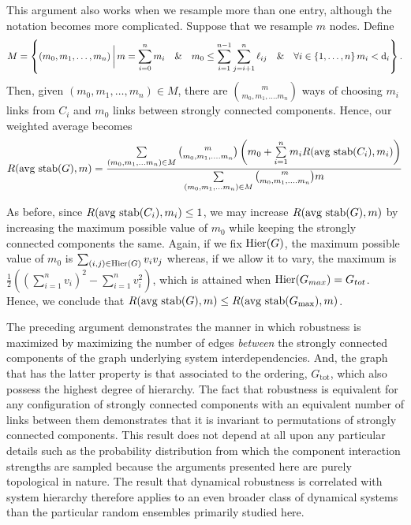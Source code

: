 This argument also works when we resample more than one entry,
although the notation becomes more complicated.  Suppose that we
resample $m$ nodes.  Define
\begin{equation*}
M = \left\{(m_0, m_1, \ldots, m_n) \,\bigg|\,
m = \sum_{i=0}^n m_i \quad\&\quad
m_0 \le \sum_{i=1}^{n-1} \sum_{j=i+1}^n \ell_{ij} \quad\&\quad
\forall i \in \{1, \ldots, n\} \, m_i < \mathrm{d}_i \right\}.
\end{equation*}
Then, given $(m_0, m_1, \ldots, m_n) \in M$, there are ${m \choose
m_0, m_1, \ldots. m_n}$ ways of choosing $m_i$ links from $C_i$ and
$m_0$ links between strongly connected components.  Hence, our
weighted average becomes
\begin{equation}
R(\hbox{avg stab} (G), m) =
\frac{\sum\limits_{(m_0, m_1, \ldots m_n) \in M}
      {m \choose m_0, m_1, \ldots. m_n}
      \left(m_0 + \sum\limits_{i=1}^n m_i R(\hbox{avg stab} (C_i), m_i) \right)}
     {\sum\limits_{(m_0, m_1, \ldots m_n) \in M}
      {m \choose m_0, m_1, \ldots. m_n} m}
\end{equation}

As before, since $R(\hbox{avg stab} (C_i), m_i) \le 1$, we may
increase $R(\hbox{avg stab} (G), m)$ by increasing the maximum
possible value of $m_0$ while keeping the strongly connected
components the same.  Again, if we fix $\mathrm{Hier}(G)$, the maximum
possible value of $m_0$ is $\sum_{(i,j) \in \mathrm{Hier}(G)} v_i v_j$
whereas, if we allow it to vary, the maximum is $\frac{1}{2} ((\sum_{i=1}^n
v_i)^2 - \sum_{i=1}^n v_i^2)$, which is attained when $\mathrm{Hier}(G_{max}) =
G_{tot}$.  Hence, we conclude that $R(\hbox{avg stab} (G), m) \le
R(\hbox{avg stab} (G_{\mathrm{max}}), m)$.

The preceding argument demonstrates the manner in which robustness is
maximized by maximizing the number of edges \emph{between} the strongly
connected components of the graph underlying system interdependencies.
And, the graph that has the latter property is that associated to the
ordering, $G_{\mathrm{tot}}$, which also possess the highest degree of
hierarchy. The fact that robustness is equivalent for any configuration
of strongly connected components with an equivalent number of links
between them demonstrates that it is invariant to permutations of
strongly connected components. This result does not depend at all upon
any particular details such as the probability distribution from which
the component interaction strengths are sampled because the arguments
presented here are purely topological in nature. The result that
dynamical robustness is correlated with system hierarchy therefore
applies to an even broader class of dynamical systems than the particular
random ensembles primarily studied here.

